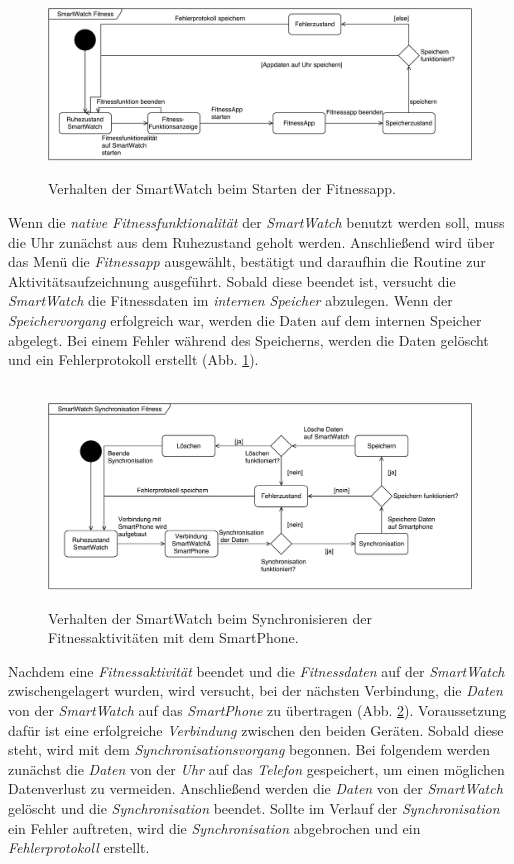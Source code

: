 \begin{figure}[h]
\centering\
\includegraphics[width=\textwidth]{img/stateFitness}
\caption[State Diagram: Fitness]{Verhalten der SmartWatch beim Starten der Fitnessapp.}
\label{fig:stateFitness}
\end{figure}
Wenn die \textit{native Fitnessfunktionalität} der \textit{SmartWatch} benutzt werden soll, muss die Uhr zunächst aus dem Ruhezustand geholt werden. Anschließend wird über das Menü die \textit{Fitnessapp} ausgewählt, bestätigt und daraufhin die Routine zur Aktivitätsaufzeichnung ausgeführt. Sobald diese beendet ist, versucht die \textit{SmartWatch} die Fitnessdaten im \textit{internen Speicher} abzulegen. Wenn der \textit{Speichervorgang} erfolgreich war, werden die Daten auf dem internen Speicher abgelegt. Bei einem Fehler während des Speicherns, werden die Daten gelöscht und ein Fehlerprotokoll erstellt (Abb. \ref{fig:stateFitness}).\\
\begin{figure}[h]
\centering\
\includegraphics[width=\textwidth]{img/stateSync}
\caption[State Diagram: Synchronisation]{Verhalten der SmartWatch beim Synchronisieren der Fitnessaktivitäten mit dem SmartPhone.}
\label{fig:stateSync}
\end{figure}
Nachdem eine \textit{Fitnessaktivität} beendet und die \textit{Fitnessdaten} auf der \textit{SmartWatch} zwischengelagert wurden, wird versucht, bei der nächsten Verbindung, die \textit{Daten} von der \textit{SmartWatch} auf das \textit{SmartPhone} zu übertragen (Abb. \ref{fig:stateSync}). Voraussetzung dafür ist eine erfolgreiche \textit{Verbindung} zwischen den beiden Geräten. Sobald diese steht, wird mit dem \textit{Synchronisationsvorgang} begonnen. Bei folgendem werden zunächst die \textit{Daten} von der \textit{Uhr} auf das \textit{Telefon} gespeichert, um einen möglichen Datenverlust zu vermeiden. Anschließend werden die \textit{Daten} von der \textit{SmartWatch} gelöscht und die \textit{Synchronisation} beendet. Sollte im Verlauf der \textit{Synchronisation} ein Fehler auftreten, wird die \textit{Synchronisation} abgebrochen und ein \textit{Fehlerprotokoll} erstellt. \\
